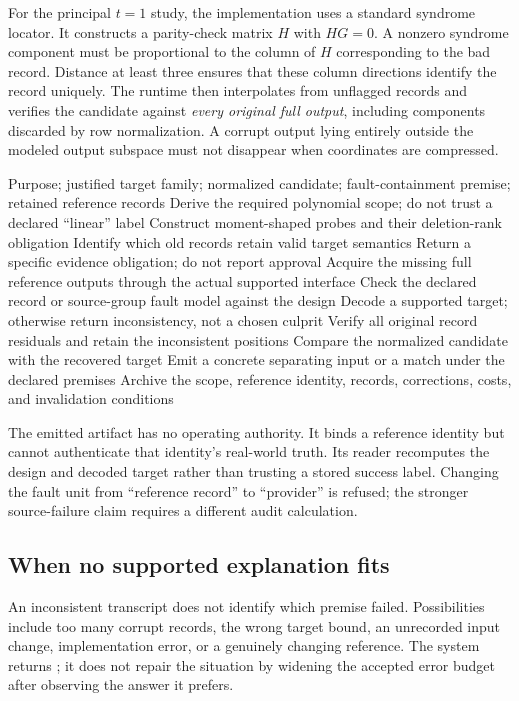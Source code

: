 \documentclass[11pt,letterpaper]{article}
\theoremstyle{remark}\newtheorem{remark}{Remark}[section]
\begin{document}
For the principal $t=1$ study, the implementation uses a standard syndrome locator. It constructs a parity-check matrix $H$ with $HG=0$. A nonzero syndrome component must be proportional to the column of $H$ corresponding to the bad record. Distance at least three ensures that these column directions identify the record uniquely. The runtime then interpolates from unflagged records and verifies the candidate against \emph{every original full output}, including components discarded by row normalization. A corrupt output lying entirely outside the modeled output subspace must not disappear when coordinates are compressed.

\begin{algorithm}[htbp]\small
\caption{Out-Reflect: construct, recover, challenge, and retain}\label{alg:main}
\begin{algorithmic}[1]
\Require Purpose; justified target family; normalized candidate; fault-containment premise; retained reference records
\State Derive the required polynomial scope; do not trust a declared ``linear'' label
\State Construct moment-shaped probes and their deletion-rank obligation
\State Identify which old records retain valid target semantics
  \State Return a specific evidence obligation; do not report approval
\EndIf
\State Acquire the missing full reference outputs through the actual supported interface
\State Check the declared record or source-group fault model against the design
\State Decode a supported target; otherwise return inconsistency, not a chosen culprit
\State Verify all original record residuals and retain the inconsistent positions
\State Compare the normalized candidate with the recovered target
\State Emit a concrete separating input or a match under the declared premises
\State Archive the scope, reference identity, records, corrections, costs, and invalidation conditions
\end{algorithmic}
\end{algorithm}

The emitted artifact has no operating authority. It binds a reference identity but cannot authenticate that identity's real-world truth. Its reader recomputes the design and decoded target rather than trusting a stored success label. Changing the fault unit from ``reference record'' to ``provider'' is refused; the stronger source-failure claim requires a different audit calculation.

\subsection{When no supported explanation fits}
An inconsistent transcript does not identify which premise failed. Possibilities include too many corrupt records, the wrong target bound, an unrecorded input change, implementation error, or a genuinely changing reference. The system returns ; it does not repair the situation by widening the accepted error budget after observing the answer it prefers.
\end{document}
